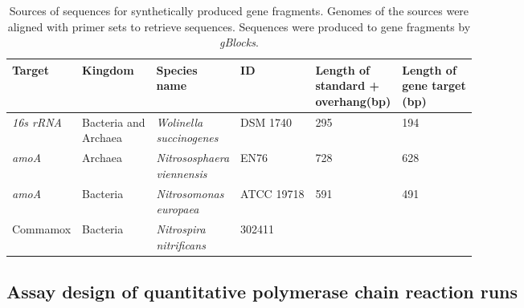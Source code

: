 \documentclass[twoside,12pt,final]{ucthesis-CA2012}
\begin{document}
\begin{ucmainmatter}
\begin{table}
\caption{\label{tab:Standards}Sources of sequences for synthetically produced gene fragments. Genomes of the sources were aligned with primer sets to retrieve sequences. Sequences were produced to gene fragments by \textit{gBlocks}.}
\centering
\begin{tabular}[t]{llllll}
\toprule
Target & Kingdom & \makecell[l]{Species\\name} & ID & \makecell[l]{Length of\\standard +\\overhang(bp)} & \makecell[l]{Length of \\gene target\\(bp)}\\
\midrule
\textit{16s rRNA} & \makecell[l]{Bacteria and\\Archaea} & \makecell[l]{\textit{Wolinella} \\ \textit{succinogenes}} & DSM 1740 & 295 & 194\\
\textit{amoA} & Archaea & \makecell[l]{\textit{Nitrososphaera} \\ \textit{viennensis}} & EN76 & 728 & 628\\
\textit{amoA} & Bacteria & \makecell[l]{\textit{Nitrosomonas} \\ \textit{europaea}} & ATCC 19718 & 591 & 491\\
Commamox & Bacteria & \makecell[l]{\textit{Nitrospira} \\ \textit{nitrificans}} & 302411 &  & \\
\bottomrule
\end{tabular}
\end{table}
\hypertarget{assay-design-of-quantitative-polymerase-chain-reaction-runs}{%
\subsection{Assay design of quantitative polymerase chain reaction runs}\label{assay-design-of-quantitative-polymerase-chain-reaction-runs}}


\end{ucmainmatter}
\end{document}
